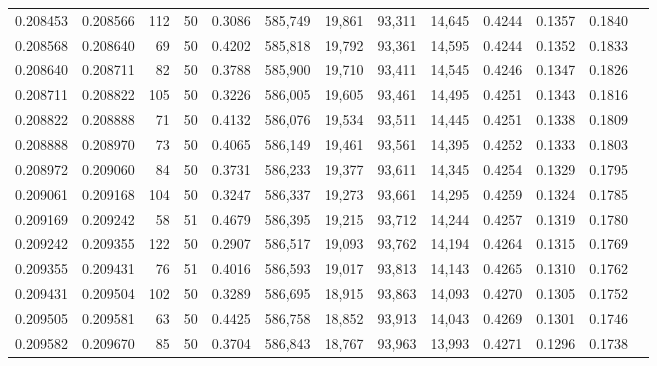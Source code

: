 \begin{tabular}{rrrrrrrrrrrrr}
0.208453 & 0.208566 &   112 &  50 &                                     0.3086 & 585,749 &  19,861 &  93,311 &  14,645 & 0.4244 & 0.1357 & 0.1840 \\
0.208568 & 0.208640 &    69 &  50 &                                     0.4202 & 585,818 &  19,792 &  93,361 &  14,595 & 0.4244 & 0.1352 & 0.1833 \\
0.208640 & 0.208711 &    82 &  50 &                                     0.3788 & 585,900 &  19,710 &  93,411 &  14,545 & 0.4246 & 0.1347 & 0.1826 \\
0.208711 & 0.208822 &   105 &  50 &                                     0.3226 & 586,005 &  19,605 &  93,461 &  14,495 & 0.4251 & 0.1343 & 0.1816 \\
0.208822 & 0.208888 &    71 &  50 &                                     0.4132 & 586,076 &  19,534 &  93,511 &  14,445 & 0.4251 & 0.1338 & 0.1809 \\
0.208888 & 0.208970 &    73 &  50 &                                     0.4065 & 586,149 &  19,461 &  93,561 &  14,395 & 0.4252 & 0.1333 & 0.1803 \\
0.208972 & 0.209060 &    84 &  50 &                                     0.3731 & 586,233 &  19,377 &  93,611 &  14,345 & 0.4254 & 0.1329 & 0.1795 \\
0.209061 & 0.209168 &   104 &  50 &                                     0.3247 & 586,337 &  19,273 &  93,661 &  14,295 & 0.4259 & 0.1324 & 0.1785 \\
0.209169 & 0.209242 &    58 &  51 &                                     0.4679 & 586,395 &  19,215 &  93,712 &  14,244 & 0.4257 & 0.1319 & 0.1780 \\
0.209242 & 0.209355 &   122 &  50 &                                     0.2907 & 586,517 &  19,093 &  93,762 &  14,194 & 0.4264 & 0.1315 & 0.1769 \\
0.209355 & 0.209431 &    76 &  51 &                                     0.4016 & 586,593 &  19,017 &  93,813 &  14,143 & 0.4265 & 0.1310 & 0.1762 \\
0.209431 & 0.209504 &   102 &  50 &                                     0.3289 & 586,695 &  18,915 &  93,863 &  14,093 & 0.4270 & 0.1305 & 0.1752 \\
0.209505 & 0.209581 &    63 &  50 &                                     0.4425 & 586,758 &  18,852 &  93,913 &  14,043 & 0.4269 & 0.1301 & 0.1746 \\
0.209582 & 0.209670 &    85 &  50 &                                     0.3704 & 586,843 &  18,767 &  93,963 &  13,993 & 0.4271 & 0.1296 & 0.1738 \\

\end{tabular}

